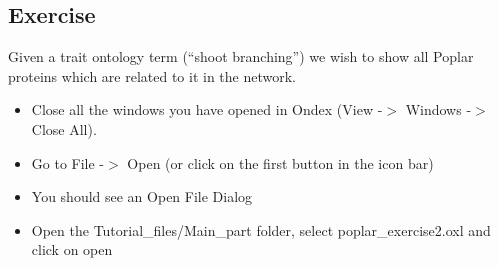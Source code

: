 \subsection{Exercise}
\label{sec:analysing_exercise}
Given a trait ontology term (``shoot branching'') we wish to show all Poplar proteins which are related to it in the network. 
\begin{itemize}
\item Close all the windows you have opened in Ondex (View -$>$ Windows -$>$ Close All).
\item Go to File -$>$ Open  (or click on the first button in the icon bar)
\item You should see an Open File Dialog
\item Open the Tutorial\_files/Main\_part folder, select poplar\_exercise2.oxl and click on open
\end{itemize}

